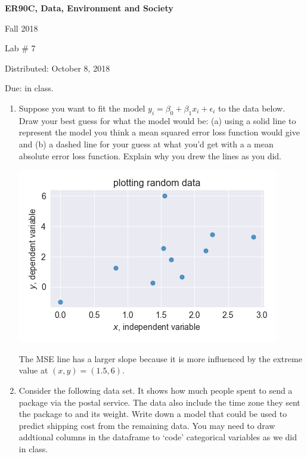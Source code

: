 \documentclass[12pt]{article}
\numberwithin{figure}{section}
\numberwithin{table}{section}
\numberwithin{equation}{section}
\begin{document}

\begin{center}
  \textbf{ER90C, Data, Environment and Society}

  Fall 2018

  Lab \# 7

  Distributed: October 8, 2018

  Due: in class.

\end{center}


\begin{enumerate}
\item  Suppose you want to fit the model $y_i = \beta_0+\beta_1 x_i + \epsilon_i$ to the data below.  Draw your best guess for what the model would be: (a) using a solid line to represent the model you think a mean squared error loss function would give and (b) a dashed line for your guess at what you'd get with a a mean absolute error loss function.  Explain why you drew the lines as you did.

\includegraphics[height=0.25\textheight]{random_data}


\ifx\status\undefined
\begin{shaded}
The MSE line has a larger slope because it is more influenced by the extreme value at $(x,y) = (1.5,6)$.  
\end{shaded}
\else
\vspace*{4cm} 
\fi

\item Consider the following data set.  It shows how much people spent to send a package via the postal service.  The data also include the time zone they sent the package to and its weight.  Write down a model that could be used to predict shipping cost from the remaining data.  You may need to draw addtional columns in the dataframe to `code' categorical variables as we did in class.   



\end{enumerate}
\end{document}

